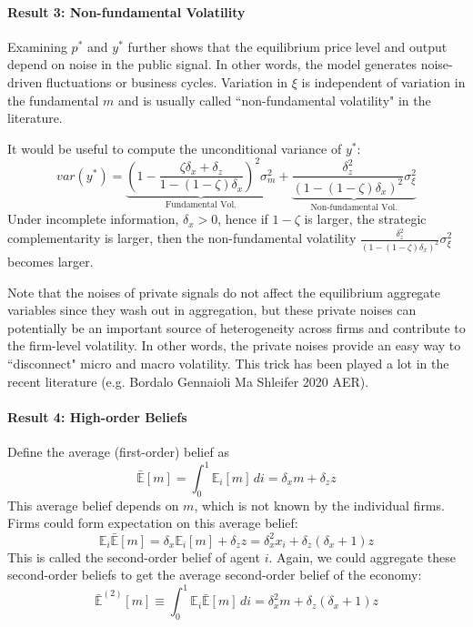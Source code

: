 \documentclass[12pt]{article}
\begin{document}
\paragraph{Result 3: Non-fundamental Volatility \\ [6pt]}

Examining $p^*$ and $y^*$ further shows that the equilibrium price level and output depend on noise in the public signal. In other words, the model generates noise-driven fluctuations or business cycles. Variation in $\xi$ is independent of variation in the fundamental $m$ and is usually called ``non-fundamental volatility" in the literature.

It would be useful to compute the unconditional variance of $y^*$:
\[var(y^*) = \underbrace{\left(1 - \frac{\zeta \delta_x + \delta_z}{1 - (1-\zeta) \delta_x}\right)^2 \sigma_m^2}_{\text{Fundamental Vol.}} + \underbrace{\frac{\delta_z^2}{(1 - (1-\zeta) \delta_x )^2}\sigma_\xi^2}_{\text{Non-fundamental Vol.}} \]
Under incomplete information, $\delta_x > 0$, hence if $1-\zeta$ is larger, the strategic complementarity is larger, then the non-fundamental volatility $\frac{\delta_z^2}{(1 - (1-\zeta) \delta_x )^2}\sigma_\xi^2$ becomes larger.

Note that the noises of private signals do not affect the equilibrium aggregate variables since they wash out in aggregation, but these private noises can potentially be an important source of heterogeneity across firms and contribute to the firm-level volatility. In other words, the private noises provide an easy way to ``disconnect" micro and macro volatility. This trick has been played a lot in the recent literature (e.g. Bordalo Gennaioli Ma Shleifer 2020 AER).


\paragraph{Result 4: High-order Beliefs \\ [6pt]}

Define the average (first-order) belief as
\begin{equation}
	\bar{\mathbb{E}}[m] = \int_{0}^{1} \mathbb{E}_i[m] \, di = \delta_x m + \delta_z z
\end{equation}
This average belief depends on $m$, which is not known by the individual firms. Firms could form expectation on this average belief:
\begin{equation}
	\mathbb{E}_i\bar{\mathbb{E}}[m] = \delta_x \mathbb{E}_i[m] + \delta_z z = \delta_x^2 x_i + \delta_z(\delta_x + 1)z
\end{equation}
This is called the second-order belief of agent $i$. Again, we could aggregate these second-order beliefs to get the average second-order belief of the economy:
\begin{equation}
	\bar{\mathbb{E}}^{(2)}[m] \equiv \int_{0}^1 \mathbb{E}_i\bar{\mathbb{E}}[m] \, di = \delta_x^2 m + \delta_z(\delta_x + 1)z
\end{equation}	
\end{document}
